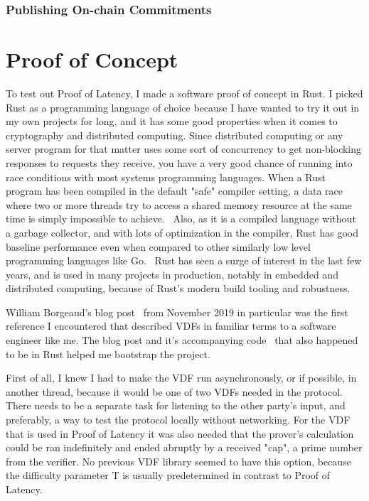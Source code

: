 
\subsection{Publishing On-chain Commitments}

\chapter{Proof of Concept}
\label{Proof of Concept}
To test out Proof of Latency, I made a software proof of concept in Rust. I picked Rust as a programming language of choice because I have wanted to try it out in my own projects for long, and it has some good properties when it comes to cryptography and distributed computing. Since distributed computing or any server program for that matter uses some sort of concurrency to get non-blocking responses to requests they receive, you have a very good chance of running into race conditions with most systems programming languages. When a Rust program has been compiled in the default "safe" compiler setting, a data race where two or more threads try to access a shared memory resource at the same time is simply impossible to achieve.~\cite{The_Rust_Project_Developers2018-xh} Also, as it is a compiled language without a garbage collector, and with lots of optimization in the compiler, Rust has good baseline performance even when compared to other similarly low level programming languages like Go.~\cite{Howarth2020-zc} Rust has seen a surge of interest in the last few years, and is used in many projects in production, notably in embedded and distributed computing, because of Rust's modern build tooling and robustness.

William Borgeaud's blog post~\cite{Borgeaud2019-wk} from November 2019 in particular was the first reference I encountered that described VDFs in familiar terms to a software engineer like me. The blog post and it's accompanying code~\cite{Borgeaud2019-wk} that also happened to be in Rust helped me bootstrap the project.

First of all, I knew I had to make the VDF run asynchronously, or if possible, in another thread, because it would be one of two VDFs needed in the protocol. There needs to be a separate task for listening to the other party's input, and preferably, a way to test the protocol locally without networking. For the VDF that is used in Proof of Latency it was also needed that the prover's calculation could be ran indefinitely and ended abruptly by a received "cap", a prime number from the verifier. No previous VDF library seemed to have this option, because the difficulty parameter T is usually predetermined in contrast to Proof of Latency.

